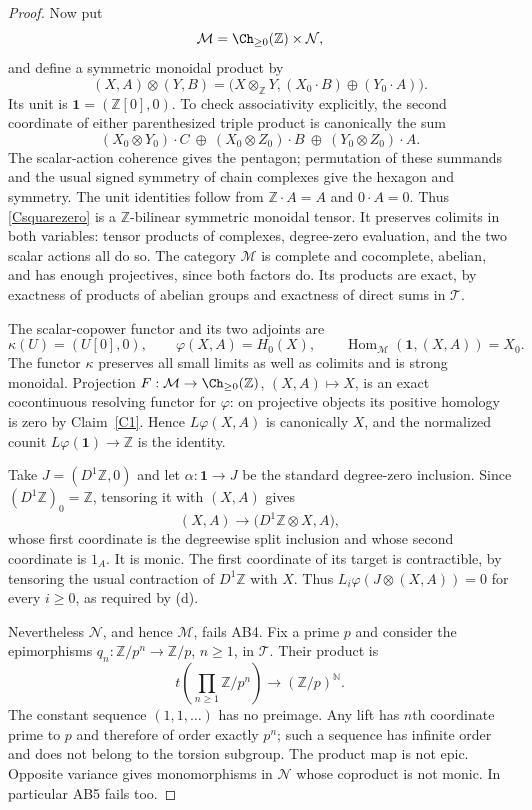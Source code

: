 \begin{proof}
Now put
\[
 \mathcal M=\Ch_{\geq0}(\mathbb Z)\times\mathcal N,
\]
and define a symmetric monoidal product by
\[
 (X,A)\otimes(Y,B)
 =\bigl(X\otimes_{\mathbb Z}Y,
        (X_0\cdot B)\oplus(Y_0\cdot A)\bigr).
 \tag{C-square-zero}\label{Csquarezero}
\]
Its unit is $\mathbf1=(\mathbb Z[0],0)$. To check associativity explicitly, the second coordinate of either parenthesized triple product is canonically the sum
\[
 (X_0\otimes Y_0)\cdot C\ \oplus\
 (X_0\otimes Z_0)\cdot B\ \oplus\
 (Y_0\otimes Z_0)\cdot A.
\]
The scalar-action coherence gives the pentagon; permutation of these summands and the usual signed symmetry of chain complexes give the hexagon and symmetry. The unit identities follow from $\mathbb Z\cdot A=A$ and $0\cdot A=0$. Thus \eqref{Csquarezero} is a $\mathbb Z$-bilinear symmetric monoidal tensor. It preserves colimits in both variables: tensor products of complexes, degree-zero evaluation, and the two scalar actions all do so. The category $\mathcal M$ is complete and cocomplete, abelian, and has enough projectives, since both factors do. Its products are exact, by exactness of products of abelian groups and exactness of direct sums in $\mathcal T$.

The scalar-copower functor and its two adjoints are
\[
 \kappa(U)=(U[0],0),\qquad
 \varphi(X,A)=H_0(X),\qquad
 \operatorname{Hom}_{\mathcal M}(\mathbf1,(X,A))=X_0.
\]
The functor $\kappa$ preserves all small limits as well as colimits and is strong monoidal. Projection $F:\mathcal M\to\Ch_{\geq0}(\mathbb Z)$, $(X,A)\mapsto X$, is an exact cocontinuous resolving functor for $\varphi$: on projective objects its positive homology is zero by Claim~\ref{C1}. Hence $L\varphi(X,A)$ is canonically $X$, and the normalized counit $L\varphi(\mathbf1)\to\mathbb Z$ is the identity.

Take $J=(D^1\mathbb Z,0)$ and let $\alpha:\mathbf1\to J$ be the standard degree-zero inclusion. Since $(D^1\mathbb Z)_0=\mathbb Z$, tensoring it with $(X,A)$ gives
\[
 (X,A)\longrightarrow\bigl(D^1\mathbb Z\otimes X,A\bigr),
\]
whose first coordinate is the degreewise split inclusion and whose second coordinate is $1_A$. It is monic. The first coordinate of its target is contractible, by tensoring the usual contraction of $D^1\mathbb Z$ with $X$. Thus $L_i\varphi(J\otimes(X,A))=0$ for every $i\geq0$, as required by (d).

Nevertheless $\mathcal N$, and hence $\mathcal M$, fails AB4. Fix a prime $p$ and consider the epimorphisms $q_n:\mathbb Z/p^n\to\mathbb Z/p$, $n\geq1$, in $\mathcal T$. Their product is
\[
 t\!\left(\prod_{n\geq1}\mathbb Z/p^n\right)
 \longrightarrow (\mathbb Z/p)^{\mathbb N}.
\]
The constant sequence $(1,1,\ldots)$ has no preimage. Any lift has $n$th coordinate prime to $p$ and therefore of order exactly $p^n$; such a sequence has infinite order and does not belong to the torsion subgroup. The product map is not epic. Opposite variance gives monomorphisms in $\mathcal N$ whose coproduct is not monic. In particular AB5 fails too.


\end{proof}
